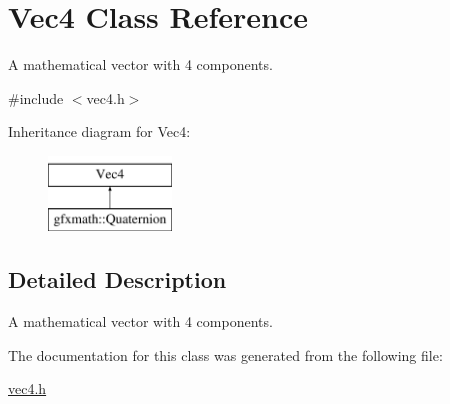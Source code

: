 \hypertarget{class_vec4}{}\section{Vec4 Class Reference}
\label{class_vec4}


A mathematical vector with 4 components.  




{\ttfamily \#include $<$vec4.\+h$>$}

Inheritance diagram for Vec4\+:\begin{figure}[H]
\begin{center}
\leavevmode
\includegraphics[height=2.000000cm]{class_vec4}
\end{center}
\end{figure}


\subsection{Detailed Description}
A mathematical vector with 4 components. 

The documentation for this class was generated from the following file\+:\begin{DoxyCompactItemize}
\item 
\hyperlink{vec4_8h}{vec4.\+h}\end{DoxyCompactItemize}
